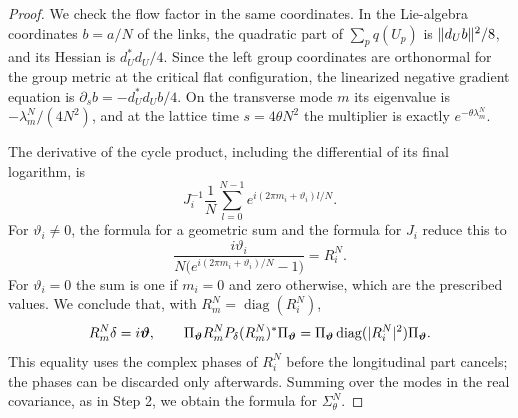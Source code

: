\begin{proof}
We check the flow factor in the same coordinates. In the Lie-algebra coordinates $b=a/N$ of the links, the quadratic part of $\sum_pq(U_p)$ is $\lVert d_Ub\rVert^2/8$, and its Hessian is $d_U^*d_U/4$. Since the left group coordinates are orthonormal for the group metric at the critical flat configuration, the linearized negative gradient equation is $\partial_sb=-d_U^*d_Ub/4$. On the transverse mode $m$ its eigenvalue is $-\lambda_m^N/(4N^2)$, and at the lattice time $s=4\theta N^2$ the multiplier is exactly $e^{-\theta\lambda_m^N}$.

The derivative of the cycle product, including the differential of its final logarithm, is
\[
 J_i^{-1}\frac1N\sum_{l=0}^{N-1}e^{i(2\pi m_i+\vartheta_i)l/N}.
\]
For $\vartheta_i\ne0$, the formula for a geometric sum and the formula for $J_i$ reduce this to
\[
 \frac{i\vartheta_i}{N\bigl(e^{i(2\pi m_i+\vartheta_i)/N}-1\bigr)}=R_i^N.
\]
For $\vartheta_i=0$ the sum is one if $m_i=0$ and zero otherwise, which are the prescribed values. We conclude that, with $R_m^N=\operatorname{diag}(R_i^N)$,
\[
 R_m^N\delta=i\bm\vartheta,\qquad\Pi_{\bm\vartheta}R_m^NP_\delta(R_m^N)^*\Pi_{\bm\vartheta}=\Pi_{\bm\vartheta}\operatorname{diag}(\lvert R_i^N\rvert^2)\Pi_{\bm\vartheta}.
\]
This equality uses the complex phases of $R_i^N$ before the longitudinal part cancels; the phases can be discarded only afterwards. Summing over the modes in the real covariance, as in Step 2, we obtain the formula for $\Sigma_\theta^N$.


\end{proof}
